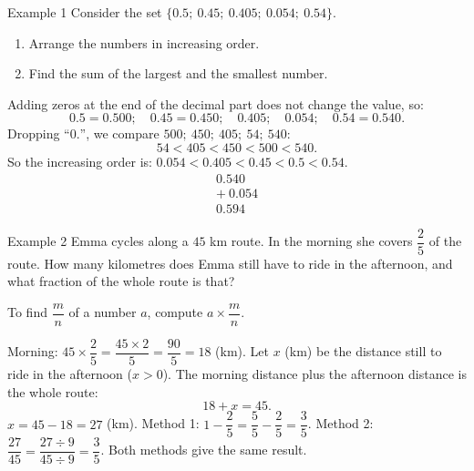\par\vspace{0.7em}\par\vspace{0.3em}

\begin{exbox}{Example 1}
Consider the set $\{0.5;\ 0.45;\ 0.405;\ 0.054;\ 0.54\}$.
\begin{enumerate}[label=\alph*),leftmargin=1.6em,itemsep=0pt,topsep=2pt]
  \item Arrange the numbers in increasing order.
  \item Find the sum of the largest and the smallest number.
\end{enumerate}
\guide
{}
Adding zeros at the end of the decimal part does not change the value, so:
\[ 0.5 = 0.500;\quad 0.45 = 0.450;\quad 0.405;\quad 0.054;\quad 0.54 = 0.540. \]
Dropping ``$0.$'', we compare $500;\ 450;\ 405;\ 54;\ 540$:
\[ 54 < 405 < 450 < 500 < 540. \]
So the increasing order is: $0.054 < 0.405 < 0.45 < 0.5 < 0.54$.
\[ \begin{array}{r} 0.540\\ +\ 0.054\\ \hline 0.594 \end{array} \]
\end{exbox}

\begin{exbox}{Example 2}
Emma cycles along a $45$ km route. In the morning she covers $\dfrac{2}{5}$ of the route. How many kilometres does Emma
still have to ride in the afternoon, and what fraction of the whole route is that?
\guide
{}
\begin{recallbox}To find $\dfrac{m}{n}$ of a number $a$, compute $a\times\dfrac{m}{n}$.\end{recallbox}
Morning: $45 \times \dfrac{2}{5} = \dfrac{45\times 2}{5} = \dfrac{90}{5} = 18$ (km).
Let $x$ (km) be the distance still to ride in the afternoon ($x > 0$). The morning distance plus the afternoon distance is
the whole route:
\[ 18 + x = 45. \]
$x = 45 - 18 = 27$ (km).
Method 1: $1 - \dfrac{2}{5} = \dfrac{5}{5} - \dfrac{2}{5} = \dfrac{3}{5}$.\quad
Method 2: $\dfrac{27}{45} = \dfrac{27\div 9}{45\div 9} = \dfrac{3}{5}$. Both methods give the same result.
\end{exbox}

